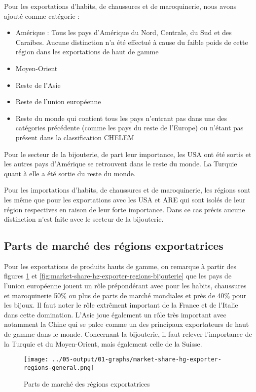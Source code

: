 \documentclass[french,10pt,a4paper]{article}
\begin{document}
Pour les exportations d'habits, de chaussures et de maroquinerie, nous avons ajouté comme catégorie :

\begin{itemize}
  \item Amérique : Tous les pays d'Amérique du Nord, Centrale, du Sud et des Caraibes. Aucune distinction n'a été effectué à cause du faible poids de cette région dans les exportations de haut de gamme
  \item Moyen-Orient
  \item Reste de l'Asie
  \item Reste de l'union européenne
  \item Reste du monde qui contient tous les pays n'entrant pas dans une des catégories précédente (comme les pays du reste de l'Europe) ou n'étant pas présent dans la classification CHELEM
\end{itemize}

Pour le secteur de la bijouterie, de part leur importance, les USA ont été sortis et les autres pays d'Amérique se retrouvent dans le reste du monde. La Turquie quant à elle a été sortie du reste du monde.

Pour les importations d'habits, de chaussures et de maroquinerie, les régions sont les même que pour les exportations avec les USA et ARE qui sont isolés de leur région respectives en raison de leur forte importance. Dans ce cas précis aucune distinction n'est faite avec le secteur de la bijouterie. 

\subsection{Parts de marché des régions exportatrices}
Pour les exportations de produits hauts de gamme, on remarque à partir des figures \ref{fig:market-share-hg-exporter-regions-general} et \ref{fig:market-share-hg-exporter-regions-bijouterie} que les pays de l'union européenne jouent un rôle prépondérant avec pour les habits, chaussures et maroquinerie 50\% ou plus de parts de marché mondiales et près de 40\% pour les bijoux. Il faut noter le rôle extrêment important de la France et de l'Italie dans cette domination. L'Asie joue également un rôle très important avec notamment la Chine qui se palce comme un des principaux exportateurs de haut de gamme dans le monde. Concernant la bijouterie, il faut relever l'importance de la Turquie et du Moyen-Orient, mais également celle de la Suisse. 

\begin{figure}[!h]
  \centering \texttt{[image: ../05-output/01-graphs/market-share-hg-exporter-regions-general.png]}
  \caption{Parts de marché des régions exportatrices}
  \label{fig:market-share-hg-exporter-regions-general}
\end{figure}
\end{document}
